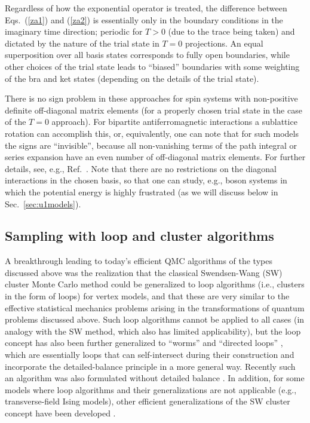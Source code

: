 \documentclass[range]{ar2e}
\begin{document}
Regardless of how the exponential operator is treated, the difference between Eqs.~(\ref{za1}) and (\ref{za2}) is essentially only in the boundary 
conditions in the imaginary time direction; periodic for $T>0$ (due to the trace being taken) and dictated by the nature of the trial state in $T=0$ 
projections. An equal superposition over all basis states corresponds to fully open boundaries, while other choices of the trial state leads to ``biased''
boundaries with some weighting of the bra and ket states (depending on the details of the trial state). 

There is no sign problem in these approaches for spin systems with non-positive definite off-diagonal matrix elements (for a properly chosen trial state in the 
case of the $T=0$ approach). For bipartite antiferromagnetic interactions a sublattice rotation can accomplish this, or, equivalently, one can note that
for such models the signs are ``invisible'', because all non-vanishing terms of the path integral or series expansion have an even number of off-diagonal 
matrix elements. For further details, see, e.g., Ref.~\cite{Henelius00}. Note that there are no restrictions on the diagonal interactions in the chosen 
basis, so that one can study, e.g., boson systems in which the potential energy is highly frustrated (as we will discuss below in Sec.~\ref{sec:u1models}).


\subsection{Sampling with loop and cluster algorithms}

A breakthrough leading to today's efficient QMC algorithms of the types discussed above
was the realization \cite{Evertz93} that the classical Swendsen-Wang (SW) cluster 
Monte Carlo method \cite{Swendsen88} could be generalized to loop algorithms (i.e., clusters in the form of loops) for vertex models, and that 
these are very similar to the effective statistical mechanics problems arising in the transformations of quantum problems discussed above. Such 
loop algorithms cannot be applied to all cases (in analogy with the SW method, which also has limited applicability), but the loop concept has also been further 
generalized to ``worms'' \cite{Prokofev96,Prokofev98, WormA} and ``directed loops'' \cite{Sandvik99,Syljuasen02}, which are essentially loops that can self-intersect
during their construction and incorporate the detailed-balance principle in a more general way. Recently such an algorithm was also formulated without
detailed balance \cite{Suwa10}. In addition, for some models where loop algorithms and their generalizations are not applicable (e.g., transverse-field 
Ising models), other efficient generalizations of the SW cluster concept have been developed \cite{Rieger99,Sandvik03}.
\end{document}
